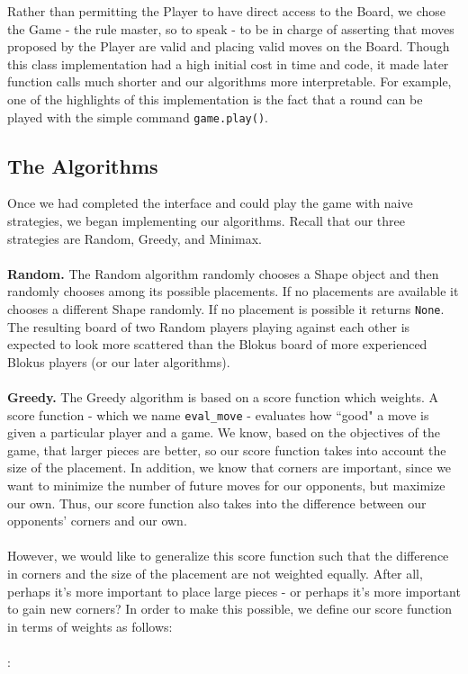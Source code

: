 \documentclass[11pt]{article}
\begin{document}
\bigskip

\noindent Rather than permitting the Player to have direct access to the Board, we chose the Game - the rule master, so to speak - to be in charge of asserting that moves proposed by the Player are valid and placing valid moves on the Board. Though this class implementation had a high initial cost in time and code, it made later function calls much shorter and our algorithms more interpretable. For example, one of the highlights of this implementation is the fact that a round can be played with the simple command \texttt{game.play()}.

\subsection{The Algorithms}

Once we had completed the interface and could play the game with naive strategies, we began implementing our algorithms. Recall that our three strategies are Random, Greedy, and Minimax.
\\\\
{\bf Random.} The Random algorithm randomly chooses a Shape object and then randomly chooses among its possible placements. If no placements are available it chooses a different Shape randomly. If no placement is possible it returns \texttt{None}. The resulting board of two Random players playing against each other is expected to look more scattered than the Blokus board of more experienced Blokus players (or our later algorithms).
\\\\
{\bf Greedy.} The Greedy algorithm is based on a score function which weights. A score function - which we name \texttt{eval\_move} - evaluates how ``good" a move is given a particular player and a game. We know, based on the objectives of the game, that larger pieces are better, so our score function takes into account the size of the placement. In addition, we know that corners are important, since we want to minimize the number of future moves for our opponents, but maximize our own. Thus, our score function also takes into the difference between our opponents' corners and our own.
\\\\
However, we would like to generalize this score function such that the difference in corners and the size of the placement are not weighted equally. After all, perhaps it's more important to place large pieces - or perhaps it's more important to gain new corners? In order to make this possible, we define our score function in terms of weights as follows:
\\\\
:
\end{document}
